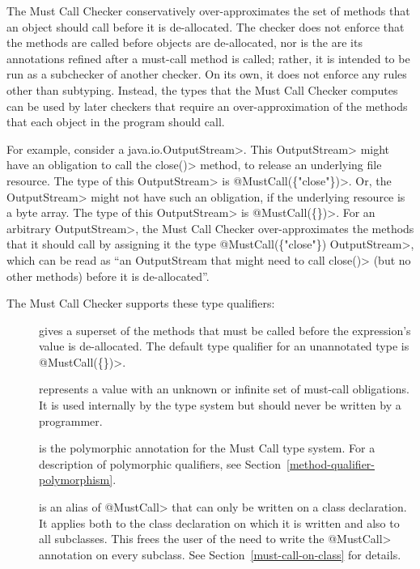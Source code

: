 \htmlhr
{}

The Must Call Checker conservatively over-approximates
the set of methods that an object should call before it is de-allocated.
The checker does not enforce that the methods are called before objects are de-allocated,
nor is the are its annotations refined after a must-call method is called; rather,
it is intended to be run as a subchecker of another checker. On its own, it does not
enforce any rules other than subtyping. Instead, the types that the Must Call Checker
computes can be used by later checkers that require an over-approximation
of the methods that each object in the program should call.

For example, consider a \<java.io.OutputStream>.  This \<OutputStream>
might have an obligation to call the \<close()> method, to release an
underlying file resource. The type of this \<OutputStream> is
\<@MustCall(\{"close"\})>.  Or, the \<OutputStream> might not have such an
obligation, if the underlying resource is a byte array. The type of this
\<OutputStream> is \<@MustCall(\{\})>.  For an arbitrary \<OutputStream>,
the Must Call Checker over-approximates the methods that it should call
by assigning it the type \<@MustCall(\{"close"\}) OutputStream>, which can
be read as ``an OutputStream that might need to call \<close()> (but no
other methods) before it is de-allocated''.


The Must Call Checker supports these type qualifiers:

\begin{description}

\item[]
  gives a superset of the methods that
  must be called before the expression's value is de-allocated.
  The default type qualifier for an unannotated type is \<@MustCall(\{\})>.

\item[]
  represents a value with an unknown or infinite set of must-call obligations.
  It is used internally by the type system but should never be written by a
  programmer.

\item[]
  is the polymorphic annotation for the Must Call type system.
  For a description of polymorphic qualifiers, see
  Section~\ref{method-qualifier-polymorphism}.

\item[]
  is an alias of \<@MustCall> that can only be written on a class declaration.
  It applies both to the class declaration on which it is written and also to all subclasses.
  This frees the user of the need to write the \<@MustCall> annotation on every subclass.
  See Section~\ref{must-call-on-class} for details.

\end{description}

